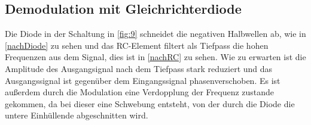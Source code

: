 \subsection{Demodulation mit Gleichrichterdiode}
\label{De-AM}

Die Diode in der Schaltung in \autoref{fig:9} schneidet die negativen Halbwellen ab, wie in \autoref{nachDiode} zu sehen und das RC-Element filtert als Tiefpass die hohen Frequenzen aus dem Signal, dies ist in \autoref{nachRC} zu sehen. Wie zu erwarten ist die Amplitude des Ausgangsignal nach dem Tiefpass stark reduziert und das Ausgangssignal ist gegenüber dem Eingangssignal phasenverschoben. Es ist außerdem durch die Modulation eine Verdopplung der Frequenz zustande gekommen, da bei dieser eine Schwebung entsteht, von der durch die Diode die untere Einhüllende abgeschnitten wird.

